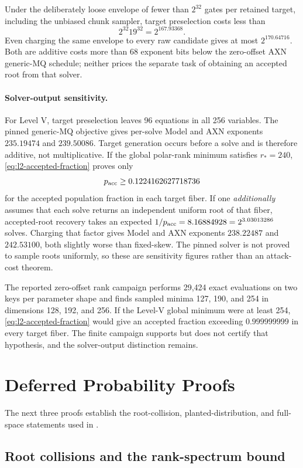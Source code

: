 \documentclass[11pt]{article}
\begin{document}
Under the deliberately loose envelope of fewer than $2^{32}$ gates per
retained target, including the unbiased chunk sampler, target preselection
costs less than
\[
 2^{32}19^{32}=2^{167.93368}.
\]
Even charging the same envelope to every raw candidate gives at most
$2^{170.64716}$.  Both are additive costs more than 68 exponent bits below
the zero-offset AXN generic-MQ schedule; neither prices the separate task of
obtaining an accepted root from that solver.

\paragraph{Solver-output sensitivity.}
For Level V, target preselection leaves 96 equations in all 256 variables.
The pinned generic-MQ objective gives per-solve Model and AXN exponents
$235.19474$ and $239.50086$.  Target generation occurs before a solve and is
therefore additive, not multiplicative.  If the global polar-rank minimum
satisfies $r_*=240$, \eqref{eq:l2-accepted-fraction} proves only
\[
 p_{\rm acc}\ge0.1224162627718736
\]
for the accepted population fraction in each target fiber.  If one
\emph{additionally} assumes that each solve returns an independent uniform
root of that fiber, accepted-root recovery takes an expected
$1/p_{\rm acc}=8.16884928=2^{3.03013286}$ solves.  Charging that factor gives
Model and AXN exponents $238.22487$ and $242.53100$, both slightly worse than
fixed-skew.  The pinned solver is not proved to sample roots uniformly, so
these are sensitivity figures rather than an attack-cost theorem.

The reported zero-offset rank campaign performs 29,424 exact evaluations on
two keys per parameter shape and finds sampled minima 127, 190, and 254 in
dimensions 128, 192, and 256.  If the Level-V global minimum were at least
254, \eqref{eq:l2-accepted-fraction} would give an accepted fraction exceeding
$0.999999999$ in every target fiber.  The finite campaign supports but does
not certify that hypothesis, and the solver-output distinction remains.

\section{Deferred Probability Proofs}\label{app:probability-proofs}

The next three proofs establish the root-collision, planted-distribution, and
full-space statements used in .

\subsection{Root collisions and the rank-spectrum bound}\label{app:proof-coset-success}
\end{document}
